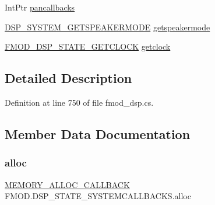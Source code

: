\begin{DoxyCompactItemize}
Int\+Ptr \hyperlink{struct_f_m_o_d_1_1_d_s_p___s_t_a_t_e___s_y_s_t_e_m_c_a_l_l_b_a_c_k_s_afda54d521f636440b3a2fbc247aea5cf}{pancallbacks}
\item 
\hyperlink{namespace_f_m_o_d_a4919c742fda4a52b284da7b14e12fbdc}{D\+S\+P\+\_\+\+S\+Y\+S\+T\+E\+M\+\_\+\+G\+E\+T\+S\+P\+E\+A\+K\+E\+R\+M\+O\+DE} \hyperlink{struct_f_m_o_d_1_1_d_s_p___s_t_a_t_e___s_y_s_t_e_m_c_a_l_l_b_a_c_k_s_a7c3598ea13e246c1327cf62906dddd73}{getspeakermode}
\item 
\hyperlink{namespace_f_m_o_d_adb43437ae95767ee797729cca4edf4e8}{F\+M\+O\+D\+\_\+\+D\+S\+P\+\_\+\+S\+T\+A\+T\+E\+\_\+\+G\+E\+T\+C\+L\+O\+CK} \hyperlink{struct_f_m_o_d_1_1_d_s_p___s_t_a_t_e___s_y_s_t_e_m_c_a_l_l_b_a_c_k_s_a5c57c77d4d15bbf15d6c356e88c0d720}{getclock}
\end{DoxyCompactItemize}


\subsection{Detailed Description}


Definition at line 750 of file fmod\+\_\+dsp.\+cs.



\subsection{Member Data Documentation}
\mbox{\label{struct_f_m_o_d_1_1_d_s_p___s_t_a_t_e___s_y_s_t_e_m_c_a_l_l_b_a_c_k_s_a618405bc061cde10937c8815a5f3195f}} 
\subsubsection{\texorpdfstring{alloc}{alloc}}
{\footnotesize\ttfamily \hyperlink{namespace_f_m_o_d_aff9ff44d1da401acbc19faf64e06a776}{M\+E\+M\+O\+R\+Y\+\_\+\+A\+L\+L\+O\+C\+\_\+\+C\+A\+L\+L\+B\+A\+CK} F\+M\+O\+D.\+D\+S\+P\+\_\+\+S\+T\+A\+T\+E\+\_\+\+S\+Y\+S\+T\+E\+M\+C\+A\+L\+L\+B\+A\+C\+K\+S.\+alloc}



